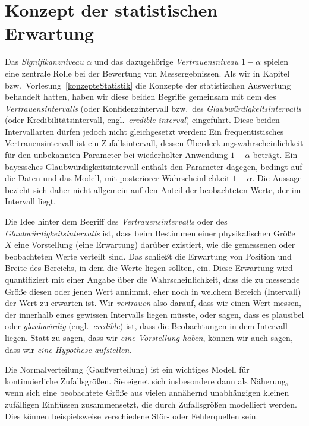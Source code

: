 
\section{Konzept der statistischen Erwartung}

Das \textsl{Signifikanzniveau} $\alpha$ und das dazugehörige \textsl{Vertrauensniveau}
$1 - \alpha$ spielen eine zentrale Rolle bei der Bewertung
von Messergebnissen. Als wir in Kapitel bzw.\ Vorlesung~\ref{konzepteStatistik} die Konzepte der statistischen Auswertung
behandelt hatten,
haben wir diese beiden Begriffe gemeinsam mit dem des \textsl{Vertrauensintervalls} (oder Konfidenzintervall bzw.\
des \textsl{Glaubwürdigkeitsintervalls} (oder Kredibilitätsintervall, engl.\ \textsl{credible interval}) eingeführt.
Diese beiden Intervallarten dürfen jedoch nicht gleichgesetzt werden: Ein frequentistisches Vertrauensintervall ist ein Zufallsintervall, dessen Überdeckungswahrscheinlichkeit für den
unbekannten Parameter bei wiederholter Anwendung $1-\alpha$ beträgt. Ein bayessches
Glaubwürdigkeitsintervall enthält den Parameter dagegen, bedingt auf die Daten und das Modell,
mit posteriorer Wahrscheinlichkeit $1-\alpha$. Die Aussage bezieht sich daher nicht allgemein
auf den Anteil der beobachteten Werte, der im Intervall liegt.

Die Idee hinter dem Begriff des \textsl{Vertrauensintervalls} oder des \textsl{Glaubwürdigkeitsintervalls}
ist, dass beim Bestimmen einer physikalischen Größe $X$ eine Vorstellung (eine Erwartung) darüber
existiert, wie die gemessenen oder beobachteten Werte verteilt sind. Das schließt die
Erwartung von Position und Breite des Bereichs, in dem die Werte liegen sollten, ein.
Diese Erwartung wird quantifiziert mit einer Angabe über die Wahrscheinlichkeit, dass die
zu messende Größe diesen oder jenen Wert annimmt, eher noch in welchem Bereich (Intervall) der
Wert zu erwarten ist. Wir \textsl{vertrauen} also darauf, dass wir einen Wert messen, der innerhalb eines
gewissen Intervalls liegen müsste, oder sagen, dass es plausibel oder \textsl{glaubwürdig}
(engl.\ \textsl{credible}) ist, dass die Beobachtungen in dem Intervall liegen.
Statt zu sagen, dass wir \textsl{eine Vorstellung haben}, können wir auch sagen,
dass wir \textsl{eine Hypothese aufstellen}.

Die Normalverteilung (Gaußverteilung) ist ein wichtiges Modell für kontinuierliche
Zufallsgrößen. Sie eignet sich insbesondere dann als Näherung, wenn sich eine beobachtete Größe aus vielen annähernd unabhängigen kleinen zufälligen Einflüssen zusammensetzt, die durch Zufallsgrößen modelliert werden. Dies können beispielsweise verschiedene Stör- oder Fehlerquellen sein.

